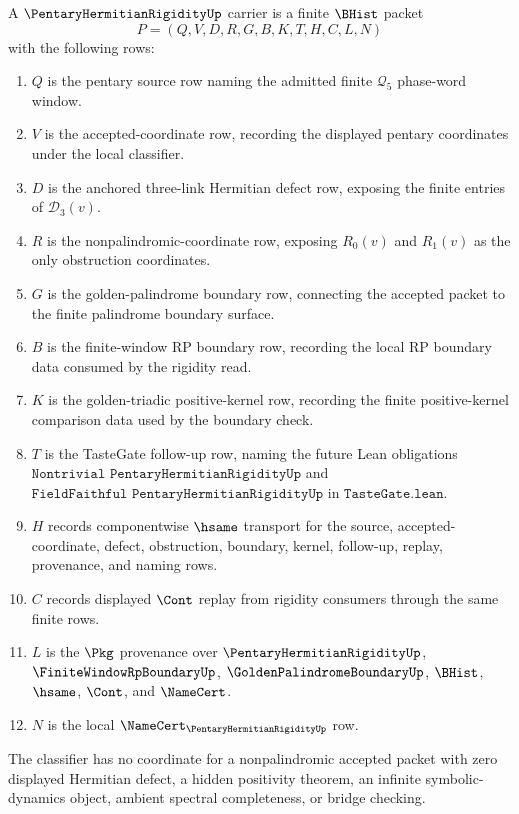 \begin{definition}
\label{def:pentary-hermitian-rigidity-carrier}
A $\PentaryHermitianRigidityUp$ carrier is a finite $\BHist$ packet
$$
P=(Q,V,D,R,G,B,K,T,H,C,L,N)
$$
with the following rows:
\begin{enumerate}
\item $Q$ is the pentary source row naming the admitted finite $\mathcal Q_5$ phase-word window.
\item $V$ is the accepted-coordinate row, recording the displayed pentary coordinates under the local classifier.
\item $D$ is the anchored three-link Hermitian defect row, exposing the finite entries of $\mathcal D_3(v)$.
\item $R$ is the nonpalindromic-coordinate row, exposing $R_0(v)$ and $R_1(v)$ as the only obstruction coordinates.
\item $G$ is the golden-palindrome boundary row, connecting the accepted packet to the finite palindrome boundary surface.
\item $B$ is the finite-window RP boundary row, recording the local RP boundary data consumed by the rigidity read.
\item $K$ is the golden-triadic positive-kernel row, recording the finite positive-kernel comparison data used by the boundary check.
\item $T$ is the TasteGate follow-up row, naming the future Lean obligations $\texttt{Nontrivial PentaryHermitianRigidityUp}$ and $\texttt{FieldFaithful PentaryHermitianRigidityUp}$ in $\texttt{TasteGate.lean}$.
\item $H$ records componentwise $\hsame$ transport for the source, accepted-coordinate, defect, obstruction, boundary, kernel, follow-up, replay, provenance, and naming rows.
\item $C$ records displayed $\Cont$ replay from rigidity consumers through the same finite rows.
\item $L$ is the $\Pkg$ provenance over $\PentaryHermitianRigidityUp$, $\FiniteWindowRpBoundaryUp$, $\GoldenPalindromeBoundaryUp$, $\BHist$, $\hsame$, $\Cont$, and $\NameCert$.
\item $N$ is the local $\NameCert_{\PentaryHermitianRigidityUp}$ row.
\end{enumerate}
The classifier has no coordinate for a nonpalindromic accepted packet with zero displayed Hermitian defect, a hidden positivity theorem, an infinite symbolic-dynamics object, ambient spectral completeness, or bridge checking.
\end{definition}

